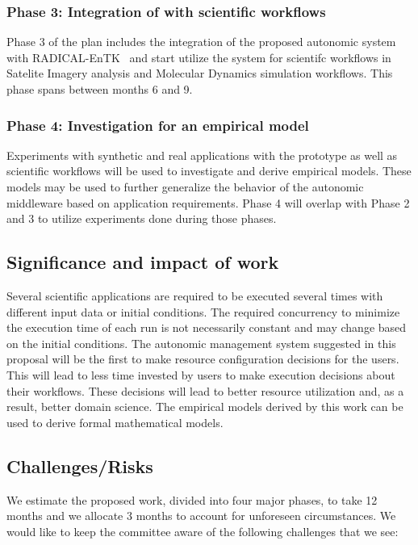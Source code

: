 \subsubsection{Phase 3: Integration of with scientific workflows}
Phase 3 of the plan includes the integration of the proposed autonomic system with 
RADICAL-EnTK~\cite{balasubramanian2018harnessing} and start utilize the system for 
scientifc workflows in Satelite Imagery analysis and Molecular Dynamics simulation 
workflows. This phase spans between months 6 and 9.

\subsubsection{Phase 4: Investigation for an empirical model}

Experiments with synthetic and real applications with the prototype as well as 
scientific workflows will be used to investigate and derive empirical models. 
These models may be used to further generalize the behavior of the autonomic 
middleware based on application requirements. Phase 4 will overlap with Phase 2 
and 3 to utilize experiments done during those phases.

\subsection{Significance and impact of work}
Several scientific applications are required to be executed several times with 
different input data or initial conditions. The required concurrency to minimize 
the execution time of each run is not necessarily constant and may change based 
on the initial conditions. The autonomic management system suggested in this 
proposal will be the first to make resource configuration decisions for the users. 
This will lead to less time invested by users to make execution decisions about 
their workflows. These decisions will lead to better resource utilization and, 
as a result, better domain science. The empirical models derived by this work can 
be used to derive formal mathematical models.

\subsection{Challenges/Risks}

We estimate the proposed work, divided into four major phases, to take 12 months 
and we allocate 3 months to account for unforeseen circumstances. We would like 
to keep the committee aware of the following challenges that we see:

